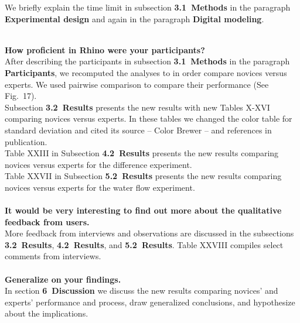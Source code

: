 \documentclass[prodmode,acmtochi]{acmsmall} %
\begin{document}
We briefly explain the time limit in 
subsection \textbf{3.1~Methods}
in the paragraph \textbf{Experimental design}
and again in the paragraph \textbf{Digital modeling}.

\hrulefill \\

\textbf{How proficient in Rhino were your participants?} \\

After describing the participants in 
subsection \textbf{3.1~Methods}
in the paragraph \textbf{Participants},
we recomputed the analyses
to in order compare novices versus experts.
We used pairwise comparison to compare their performance 
(See Fig.~17). \\

Subsection \textbf{3.2~Results} presents the new results 
with new Tables X-XVI comparing novices versus experts. 
In these tables we changed the color table for standard deviation
and cited its source -- Color Brewer -- and references in publication. \\

Table XXIII in Subsection \textbf{4.2~Results}
presents the new results comparing novices versus experts
for the difference experiment. \\

Table XXVII in Subsection \textbf{5.2~Results}
presents the new results comparing novices versus experts
for the water flow experiment.  \\

\hrulefill \\

\textbf{It would be very interesting to find out more 
about the qualitative feedback from users.} \\

More feedback from interviews and observations are discussed in the subsections \textbf{3.2~Results}, \textbf{4.2~Results}, and \textbf{5.2~Results}.
Table XXVIII compiles select comments from interviews. \\

\hrulefill \\

\textbf{Generalize on your findings.}\\

In section \textbf{6~Discussion}
we discuss the new results 
comparing novices' and experts' performance and process, 
draw generalized conclusions, and 
hypothesize about the implications. \\
\end{document}
